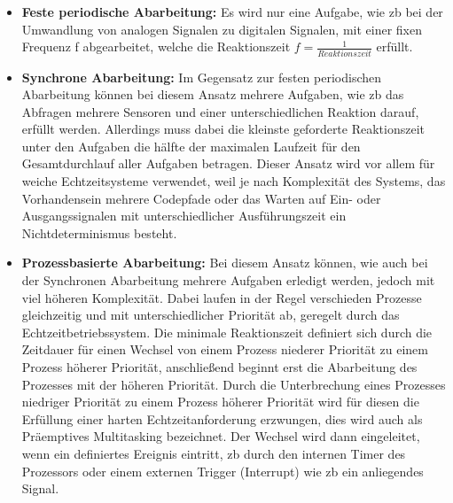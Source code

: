 \documentclass[../EDF Master Thesis.tex]{subfiles}
\begin{document}
    \begin{itemize}
        \item \textbf{Feste periodische Abarbeitung:} Es wird nur eine Aufgabe, wie \ac{zb} bei der Umwandlung von analogen Signalen zu digitalen Signalen, mit einer fixen Frequenz f abgearbeitet, welche die Reaktionszeit $ f = \frac{1}{Reaktionszeit}$ erfüllt.
        \item \textbf{Synchrone Abarbeitung:} Im Gegensatz zur festen periodischen Abarbeitung können bei diesem Ansatz mehrere Aufgaben, wie \ac{zb} das Abfragen mehrere Sensoren und einer unterschiedlichen Reaktion darauf, erfüllt werden.
            Allerdings muss dabei die kleinste geforderte Reaktionszeit unter den Aufgaben die hälfte der maximalen Laufzeit für den Gesamtdurchlauf aller Aufgaben betragen.
            Dieser Ansatz wird vor allem für weiche Echtzeitsysteme verwendet, weil je nach Komplexität des Systems, das Vorhandensein mehrere Codepfade oder das Warten auf Ein- oder Ausgangssignalen mit unterschiedlicher Ausführungszeit ein Nichtdeterminismus besteht.
        \item \textbf{Prozessbasierte Abarbeitung:} Bei diesem Ansatz können, wie auch bei der Synchronen Abarbeitung mehrere Aufgaben erledigt werden, jedoch mit viel höheren Komplexität.
            Dabei laufen in der Regel verschieden Prozesse gleichzeitig und mit unterschiedlicher Priorität ab, geregelt durch das Echtzeitbetriebssystem.
            Die minimale Reaktionszeit definiert sich durch die Zeitdauer für einen Wechsel von einem Prozess niederer Priorität zu einem Prozess höherer Priorität, anschließend beginnt erst die Abarbeitung des Prozesses mit der höheren Priorität.
            Durch die Unterbrechung eines Prozesses niedriger Priorität zu einem Prozess höherer Priorität wird für diesen die Erfüllung einer harten Echtzeitanforderung erzwungen, dies wird auch als Präemptives Multitasking bezeichnet.
            Der Wechsel wird dann eingeleitet, wenn ein definiertes Ereignis eintritt, \ac{zb} durch den internen Timer des Prozessors oder einem externen Trigger (Interrupt) wie \ac{zb} ein anliegendes Signal.
    \end{itemize}
    \parencite{wiki:001, echtzeit-grundlagen}
\end{document}
